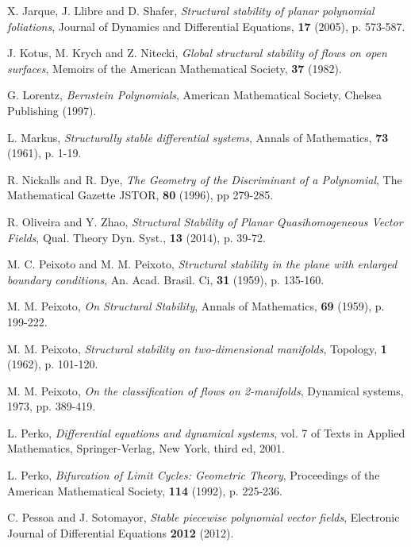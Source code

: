 \documentclass[11pt]{amsart}
\begin{document}
\begin{thebibliography}{99}
{\sc X. Jarque, J. Llibre and D. Shafer}, 
{\it Structural stability of planar polynomial foliations},
Journal of Dynamics and Differential Equations, \textbf{17} (2005), p. 573-587.

{\sc J. Kotus, M. Krych and Z. Nitecki}, 
{\it Global structural stability of flows on open surfaces},
Memoirs of the American Mathematical Society, \textbf{37} (1982).

{\sc G. Lorentz}, 
{\it Bernstein Polynomials},
American Mathematical Society, Chelsea Publishing (1997).
	
{\sc L. Markus}, 
{\it Structurally stable differential systems},
Annals of Mathematics, \textbf{73} (1961),  p. 1-19.

{\sc R. Nickalls and R. Dye}, 
{\it The Geometry of the Discriminant of a Polynomial},
The Mathematical Gazette JSTOR, \textbf{80} (1996), pp 279-285.

{\sc R. Oliveira and Y. Zhao}, 
{\it Structural Stability of Planar Quasihomogeneous Vector Fields},
Qual. Theory Dyn. Syst., \textbf{13} (2014),  p. 39-72.
	
{\sc M. C. Peixoto and M. M. Peixoto}, 
{\it Structural stability in the plane with enlarged boundary conditions},
An. Acad. Brasil. Ci, \textbf{31} (1959), p. 135-160.
	
{\sc M. M. Peixoto}, 
{\it On Structural Stability},
Annals of Mathematics, \textbf{69} (1959), p. 199-222.
	
{\sc M. M. Peixoto}, 
{\it Structural stability on two-dimensional manifolds},
Topology, \textbf{1} (1962), p. 101-120.
	
{\sc M. M. Peixoto}, 
{\it On the classification of flows on 2-manifolds},
Dynamical systems, 1973, pp. 389-419.
	
{\sc L. Perko}, 
{\it Differential equations and dynamical systems},
vol. 7 of Texts in Applied Mathematics, Springer-Verlag, New York, third ed, 2001.

{\sc L. Perko}, 
{\it Bifurcation of Limit Cycles: Geometric Theory},
Proceedings of the American Mathematical Society, \textbf{114} (1992), p. 225-236.

{\sc C. Pessoa and J. Sotomayor}, 
{\it Stable piecewise polynomial vector fields},
Electronic Journal of Differential Equations \textbf{2012} (2012).


\end{thebibliography}
\end{document}
